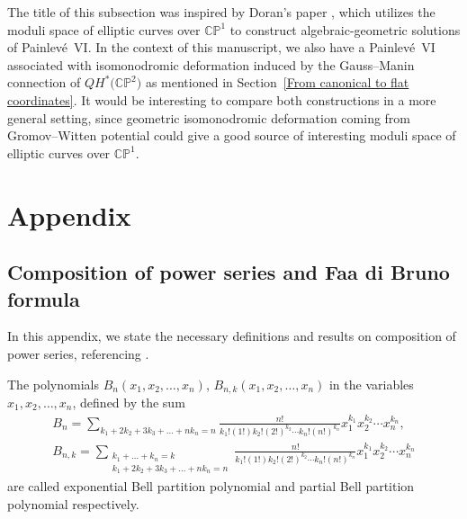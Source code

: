 \documentclass[pdftex]{sigma}
\numberwithin{equation}{section}
\begin{document}
\begin{Remark}
The title of this subsection was inspired by Doran's paper \cite{Doran}, which utilizes the moduli space of elliptic curves over $\mathbb{CP}^1$ to construct algebraic-geometric solutions of Painlev\'e~VI. In the context of this manuscript, we also have a Painlev\'e~VI associated with isomonodromic deformation induced by the Gauss--Manin connection of $QH^{*}\bigl(\mathbb{CP}^2\bigr)$ as mentioned in Section~\ref{From canonical to flat coordinates}. It would be interesting to compare both constructions in a more general setting, since geometric isomonodromic deformation coming from Gromov--Witten potential could give a good source of interesting moduli space of elliptic curves over $\mathbb{CP}^1$.
\end{Remark}


\appendix
\section{Appendix}


\subsection{Composition of power series and Faa di Bruno formula}

In this appendix, we state the necessary definitions and results on composition of power series, referencing \cite[Chapter~11]{Charalambides}.

\begin{Definition}
The polynomials $B_n(x_1,x_2,\dots,x_n)$, $B_{n,k}(x_1,x_2,\dots,x_n)$ in the variables~${x_1,x_2,\dots,x_n}$, defined by the sum
\begin{gather}
B_{n}=\sum_{ k_1+2k_2+3k_3+\dots +nk_{n}=n} \frac{n!}{k_1!(1!)k_2!(2!)^{k_2}\cdots k_n!(n!)^{k_n}} x_1^{k_1}x_2^{k_2}\cdots x_n^{k_n},\nonumber\\
B_{n,k}=\sum_{\substack{ k_1+\dots +k_n=k\\ k_1+2k_2+3k_3+\dots +nk_{n}=n}} \frac{n!}{k_1!(1!)k_2!(2!)^{k_2}\cdots k_n!(n!)^{k_n}} x_1^{k_1}x_2^{k_2}\cdots x_n^{k_n}\label{Bell polynomials}
\end{gather}
 are called exponential Bell partition polynomial and partial Bell partition polynomial respectively.
\end{Definition}
\end{document}
